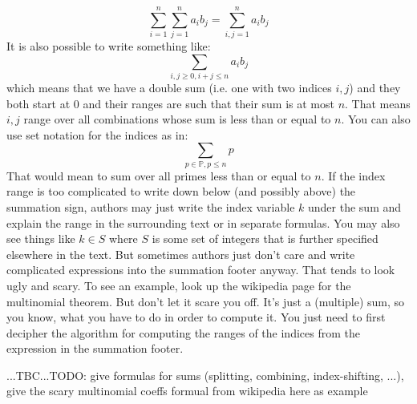 \begin{equation}
 \sum_{i=1}^{n} \sum_{j=1}^n  a_i b_j = \sum_{i,j=1}^{n} a_i b_j
\end{equation}
It is also possible to write something like:
\begin{equation}
 \sum_{i,j \geq 0, i+j \leq n} a_i b_j
\end{equation}
which means that we have a double sum (i.e. one with two indices $i,j$) and they both start at $0$ and their ranges are such that their sum is at most $n$. That means $i,j$ range over all combinations whose sum is less than or equal to $n$. You can also use set notation for the indices as in:
\begin{equation}
 \sum_{p \in \mathbb{P}, p \leq n} p
\end{equation}
That would mean to sum over all primes less than or equal to $n$. If the index range is too complicated to write down below (and possibly above) the summation sign, authors may just write the index variable $k$ under the sum and explain the range in the surrounding text or in separate formulas. You may also see things like $k \in S$ where $S$ is some set of integers that is further specified elsewhere in the text. But sometimes authors just don't care and write complicated expressions into the summation footer anyway. That tends to look ugly and scary. To see an example, look up the wikipedia page for the multinomial theorem. But don't let it scare you off. It's just a (multiple) sum, so you know, what you have to do in order to compute it. You just need to first decipher the algorithm for computing the ranges of the indices from the expression in the summation footer. 

...TBC...TODO: give formulas for sums (splitting, combining, index-shifting, ...), give the scary multinomial coeffs formual from wikipedia here as example






